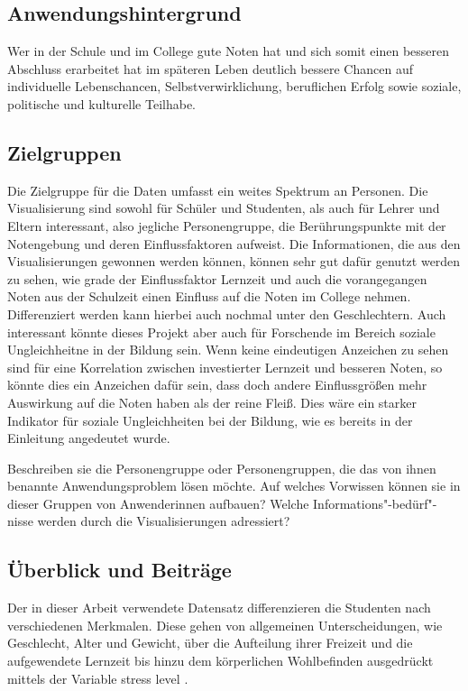 \documentclass[usegeometry=true]{scrartcl}
\begin{document}
\subsection{Anwendungshintergrund}
Wer in der Schule und im College gute Noten hat und sich somit einen besseren Abschluss erarbeitet hat im späteren Leben deutlich bessere Chancen auf \glqq individuelle Lebenschancen, Selbstverwirklichung, beruflichen Erfolg sowie soziale, politische und kulturelle Teilhabe. \grqq





\subsection{Zielgruppen}
Die Zielgruppe für die Daten umfasst ein weites Spektrum an Personen. Die Visualisierung sind sowohl für Schüler und Studenten, als auch für Lehrer und Eltern interessant, also jegliche Personengruppe, die Berührungspunkte mit der Notengebung und deren Einflussfaktoren aufweist.
Die Informationen, die aus den Visualisierungen gewonnen werden können, können sehr gut dafür genutzt werden zu sehen, wie grade der Einflussfaktor Lernzeit und auch die vorangegangen Noten aus der Schulzeit einen Einfluss auf die Noten im College nehmen. Differenziert werden kann hierbei auch nochmal unter den Geschlechtern. 
Auch interessant könnte dieses Projekt aber auch für Forschende im Bereich soziale Ungleichheitne in der Bildung sein. Wenn keine eindeutigen Anzeichen zu sehen sind für eine Korrelation zwischen investierter Lernzeit und besseren Noten, so könnte dies ein Anzeichen dafür sein, dass doch andere Einflussgrößen mehr Auswirkung auf die Noten haben als der reine Fleiß. Dies wäre ein starker Indikator für soziale Ungleichheiten bei der Bildung, wie es bereits in der Einleitung angedeutet wurde. 



Beschreiben sie die Personengruppe oder Personengruppen, die das von ihnen benannte Anwendungsproblem lösen möchte. Auf welches Vorwissen können sie in dieser Gruppen von Anwenderinnen aufbauen? Welche Informations"-bedürf"-nisse werden durch die Visualisierungen adressiert?
\subsection{Überblick und Beiträge}
Der in dieser Arbeit verwendete Datensatz differenzieren die Studenten nach verschiedenen Merkmalen. Diese gehen von allgemeinen Unterscheidungen, wie Geschlecht, Alter und Gewicht, über die Aufteilung ihrer Freizeit und die aufgewendete Lernzeit bis hinzu dem körperlichen Wohlbefinden ausgedrückt mittels der Variable \glq stress level \grq .
\end{document}

